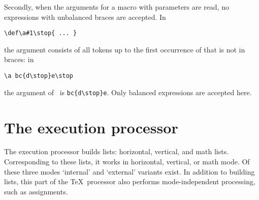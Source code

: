 \documentclass[letterpaper]{book}
\begin{document}
Secondly, when the arguments for a macro with
parameters are read, no expressions with unbalanced braces
are accepted. In 
\begin{verbatim}
\def\a#1\stop{ ... }
\end{verbatim}
the argument consists of all
tokens up to the first occurrence of 
that is not in braces: in
\begin{verbatim}
\a bc{d\stop}e\stop
\end{verbatim}
the argument of~ is \verb>bc{d\stop}e>.
Only balanced expressions
are accepted here.

\section{The execution processor}

The execution processor builds lists: horizontal, vertical,
and math lists. Corresponding to these lists, it works
in horizontal, vertical, or math mode. Of these three modes
`internal' and `external' variants exist.
In addition to building lists, this part of the \TeX\ processor
also performs mode-independent processing, such as
assignments.
\end{document}
